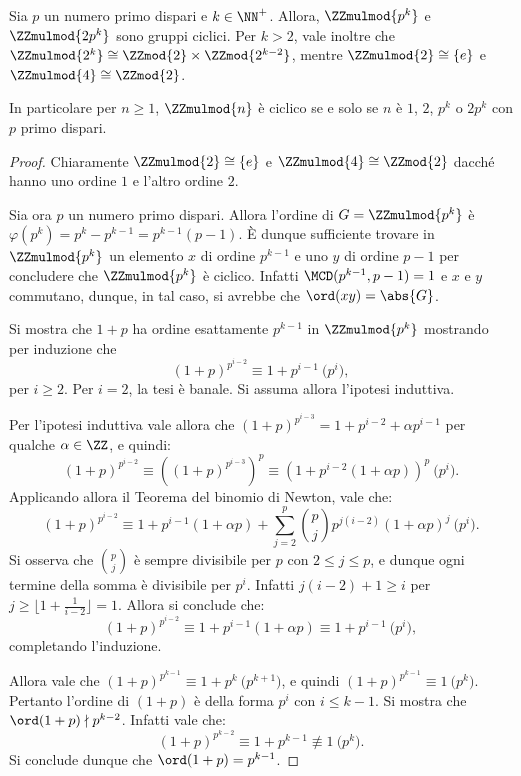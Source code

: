 \documentclass[12pt]{scrartcl}
\begin{document}
	\begin{theorem}
		Sia $p$ un numero primo dispari e $k \in \NN^+$. Allora,
		$\ZZmulmod{p^k}$ e $\ZZmulmod{2p^k}$ sono gruppi
		ciclici. Per $k > 2$, vale inoltre che
		$\ZZmulmod{2^k} \cong \ZZmod{2} \times \ZZmod{2^{k-2}}$,
		mentre $\ZZmulmod{2} \cong \{e\}$ e $\ZZmulmod{4} \cong
		\ZZmod{2}$. \medskip
		
		
		In particolare per $n \geq 1$, $\ZZmulmod{n}$ è ciclico se e solo se
		$n$ è $1$, $2$, $p^k$ o $2p^k$ con $p$ primo dispari.
	\end{theorem}
	
	\begin{proof}
		Chiaramente $\ZZmulmod{2} \cong \{e\}$ e
		$\ZZmulmod{4} \cong \ZZmod{2}$ dacché hanno uno
		ordine $1$ e l'altro ordine $2$. \medskip

		
		Sia ora $p$ un numero primo dispari. Allora l'ordine di
		$G = \ZZmulmod{p^k}$ è $\varphi(p^k) = p^k - p^{k-1} =
		p^{k-1}(p-1)$. È dunque sufficiente trovare in
		$\ZZmulmod{p^k}$ un elemento $x$ di ordine
		$p^{k-1}$ e uno $y$ di ordine $p-1$ per concludere
		che $\ZZmulmod{p^k}$ è ciclico. Infatti $\MCD(p^{k-1}, p-1) = 1$ e $x$ e $y$ commutano, dunque, in tal caso, si avrebbe
		che $\ord(xy) = \abs{G}$. \medskip
		
		
		Si mostra che $1+p$ ha ordine esattamente $p^{k-1}$ in
		$\ZZmulmod{p^k}$ mostrando per induzione che
		\[ (1+p)^{p^{i-2}} \equiv 1 + p^{i-1} \pod{p^i}, \]
		per $i \geq 2$. Per $i = 2$, la tesi è banale. Si
		assuma allora l'ipotesi induttiva. \medskip
		
		Per l'ipotesi induttiva vale allora che
		$(1+p)^{p^{i-3}} = 1 + p^{i-2} + \alpha p^{i-1}$ per qualche
		$\alpha \in \ZZ$, e quindi:
		\[ (1+p)^{p^{i-2}} \equiv ((1+p)^{p^{i-3}})^p \equiv
		(1 + p^{i-2}(1 + \alpha p))^p \pod{p^i}. \]
		Applicando allora il Teorema del binomio di Newton,
		vale che:
		\[ (1+p)^{p^{i-2}} \equiv 1 + p^{i-1}(1+\alpha p) + \sum_{j=2}^{p} \binom{p}{j} p^{j(i-2)}(1 + \alpha p)^j \pod{p^i}. \]
		Si osserva che $\binom{p}{j}$ è sempre divisibile per $p$
		con $2 \leq j \leq p$, e dunque ogni termine della
		somma è divisibile per $p^i$. Infatti $j(i-2)+1 \geq i$
		per $j \geq \lfloor 1 + \frac{1}{i-2} \rfloor = 1$. Allora
		si conclude che:
		\[  (1+p)^{p^{i-2}} \equiv 1 + p^{i-1}(1+\alpha p) \equiv 1  + p^{i-1} \pod{p^i}, \]
		completando l'induzione. \medskip
		
		
		Allora vale che $(1+p)^{p^{k-1}} \equiv 1 + p^k \pod{p^{k+1}}$,
		e quindi $(1+p)^{p^{k-1}} \equiv 1 \pod{p^k}$. Pertanto
		l'ordine di $(1+p)$ è della forma $p^i$ con $i \leq k-1$.
		Si mostra che $\ord(1+p) \nmid p^{k-2}$. Infatti vale
		che:
		\[ (1+p)^{p^{k-2}} \equiv 1 + p^{k-1} \not\equiv 1 \pod{p^k}. \]
		Si conclude dunque che $\ord(1+p) = p^{k-1}$. \bigskip
		

\end{proof}
\end{document}
